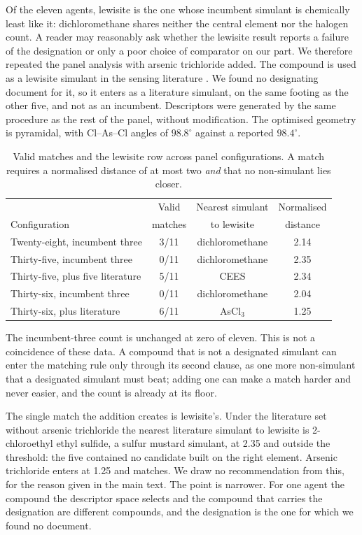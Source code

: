\documentclass[11pt,a4paper]{article}
\begin{document}
\begin{sloppypar}
Of the eleven agents, lewisite is the one whose incumbent simulant is
chemically least like it: dichloromethane shares neither the central element
nor the halogen count. A reader may reasonably ask whether the lewisite result
reports a failure of the designation or only a poor choice of comparator on
our part. We therefore repeated the panel analysis with arsenic trichloride
added. The compound is used as a lewisite simulant in the sensing
literature \cite{lee2016lewisite}. We found no designating document for it,
so it enters as a literature simulant, on the same footing as the other
five, and not as an incumbent. Descriptors were generated by the same procedure as the
rest of the panel, without modification. The optimised geometry is pyramidal,
with Cl--As--Cl angles of $98.8^\circ$ against a reported $98.4^\circ$.
\end{sloppypar}

\begin{table}[htbp]
\centering
\caption{Valid matches and the lewisite row across panel configurations.
A match requires a normalised distance of at most two \emph{and} that no
non-simulant lies closer.}
\label{tab:si-ascl3}
\small
\begin{tabular}{@{}lccc@{}}
\hline
 & Valid & Nearest simulant & Normalised \\
Configuration & matches & to lewisite & distance \\
\hline
Twenty-eight, incumbent three & 3/11 & dichloromethane & 2.14 \\
Thirty-five, incumbent three & 0/11 & dichloromethane & 2.35 \\
Thirty-five, plus five literature & 5/11 & CEES & 2.34 \\
Thirty-six, incumbent three & 0/11 & dichloromethane & 2.04 \\
Thirty-six, plus literature & 6/11 & AsCl$_3$ & 1.25 \\
\hline
\end{tabular}
\end{table}

The incumbent-three count is unchanged at zero of eleven. This is not a
coincidence of these data. A compound that is not a designated simulant can
enter the matching rule only through its second clause, as one more
non-simulant that a designated simulant must beat; adding one can make a match
harder and never easier, and the count is already at its floor.

The single match the addition creates is lewisite's. Under the literature set
without arsenic trichloride the nearest literature simulant to lewisite is
2-chloroethyl ethyl sulfide, a sulfur mustard simulant, at 2.35 and outside
the threshold: the five contained no candidate built on the right element.
Arsenic trichloride enters at 1.25 and matches. We draw no recommendation from
this, for the reason given in the main text. The point is narrower. For one
agent the compound the descriptor space selects and the compound that carries
the designation are different compounds, and the designation is the one for
which we found no document.
\end{document}
